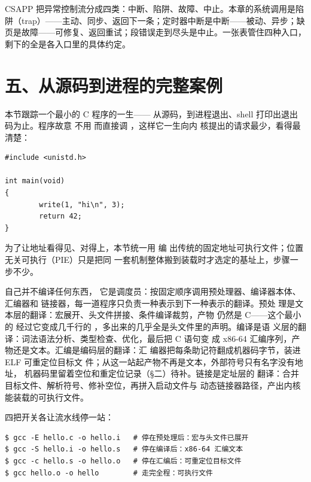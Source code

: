 \begin{classicnote}
CSAPP 把异常控制流分成四类：中断、陷阱、故障、中止。本章的系统调用是陷阱（trap）——主动、同步、返回下一条；定时器中断是中断——被动、异步；缺页是故障——可修复、返回重试；段错误走到尽头是中止。一张表管住四种入口，剩下的全是各入口里的具体约定。
\end{classicnote}

\section{五、从源码到进程的完整案例}

本节跟踪一个最小的 C 程序的一生——
从源码，到进程退出、shell 打印出退出码为止。程序故意
不用  而直接调 ，这样它一生向内
核提出的请求最少，看得最清楚：

\begin{lstlisting}
#include <unistd.h>

int main(void)
{
        write(1, "hi\n", 3);
        return 42;
}
\end{lstlisting}

为了让地址看得见、对得上，本节统一用  编
出传统的固定地址可执行文件；位置无关可执行（PIE）只是把同
一套机制整体搬到装载时才选定的基址上，步骤一步不少。

 自己并不编译任何东西，
它是调度员：按固定顺序调用预处理器、编译器本体、汇编器和
链接器，每一道程序只负责一种表示到下一种表示的翻译。预处
理是文本层的翻译：宏展开、头文件拼接、条件编译裁剪，产物
仍然是 C——这个最小的  经过它变成几千行的
，多出来的几乎全是头文件里的声明。编译是语
义层的翻译：词法语法分析、类型检查、优化，最后把 C 语句变
成 x86-64 汇编序列，产物还是文本。汇编是编码层的翻译：汇
编器把每条助记符翻成机器码字节，装进 ELF 可重定位目标文
件；从这一站起产物不再是文本，外部符号只有名字没有地址，
机器码里留着空位和重定位记录（§二）待补。链接是定址层的
翻译：合并目标文件、解析符号、修补空位，再拼入启动文件与
动态链接器路径，产出内核能装载的可执行文件。

四把开关各让流水线停一站：

\begin{lstlisting}
$ gcc -E hello.c -o hello.i   # 停在预处理后：宏与头文件已展开
$ gcc -S hello.i -o hello.s   # 停在编译后：x86-64 汇编文本
$ gcc -c hello.s -o hello.o   # 停在汇编后：可重定位目标文件
$ gcc hello.o -o hello        # 走完全程：可执行文件
\end{lstlisting}

